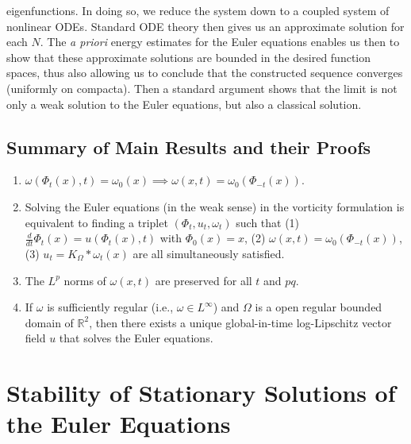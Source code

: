 \documentclass{article}
\begin{document}
eigenfunctions. In doing so, we reduce the system down to a coupled system of nonlinear ODEs. Standard ODE theory then gives us an approximate solution for each $N$. The \textit{a priori} energy estimates for the Euler equations enables us then to show that these approximate solutions are bounded in the desired function spaces, thus also allowing us to conclude that the constructed sequence converges (uniformly on compacta). Then a standard argument shows that the limit is not only a weak solution to the Euler equations, but also a classical solution.
	
	\subsection{Summary of Main Results and their Proofs} 
	\begin{enumerate}[label = (\arabic{*})]
		\item $\omega(\Phi_{t}(x),t) = \omega_{0}(x) \implies \omega(x, t) = \omega_{0}(\Phi_{-t}(x))$. 
		\item Solving the Euler equations (in the weak sense) in the vorticity formulation is equivalent to finding a triplet $(\Phi_{t}, u_{t}, \omega_{t})$ such that (1) $\frac{d}{dt}\Phi_{t}(x) = u(\Phi_{t}(x),t)$ with $\Phi_{0}(x) =x$, (2) $\omega(x, t) = \omega_{0}(\Phi_{-t}(x))$, (3) $u_{t} = K_{\Omega} \ast \omega_{t}(x)$ are all simultaneously satisfied. 
		\item The $L^{p}$ norms of $\omega(x, t)$ are preserved for all $t$ and $pq$. 
		\item If $\omega$ is sufficiently regular (i.e., $\omega \in L^{\infty}$) and $\Omega$ is a open regular bounded domain of $\mathbb{R}^{2}$, then there exists a unique global-in-time log-Lipschitz vector field $u$ that solves the Euler equations. 
	\end{enumerate} 
	
	\section{Stability of Stationary Solutions of the Euler Equations} 
\end{document}
